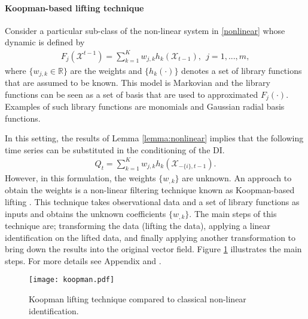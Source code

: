 \paragraph{Koopman-based lifting technique}
Consider a particular sub-class of the non-linear system in \eqref{nonlinear} whose dynamic is defined by
\begin{align}\label{nonlin}
F_{j}(\mathcal{X}^{t-1}) = \sum_{k=1}^K w_{j,k} h_k(\mathcal{X}_{t-1}), \ \ j=1,...,m,
\end{align}
where $\{w_{j,k}\in\mathbb{R}\}$ are the weights and $\{h_k(\cdot)\}$ denotes a set of library functions that are assumed to be known.
This model is Markovian and the library functions can be seen as a set of basis that are used to approximated $F_j(\cdot)$.
Examples of such library functions are monomials and Gaussian radial basis functions. 



In this setting, the results of Lemma \ref{lemma:nonlinear} implies that the following time series can be substituted in the conditioning of the DI. 
\begin{align}
    Q_t = \sum_{k=1}^K w_{j,k} h_k(\mathcal{X}_{-\{i\},t-1}).
\end{align}
However, in this formulation, the weights $\{w_{,k}\}$ are unknown. 
An approach to obtain the weights is a non-linear filtering technique known as Koopman-based lifting \citet{koopman1931hamiltonian}. 
This technique takes observational data and a set of library functions as inputs and obtains the unknown coefficients $\{w_{,k}\}$.
The main steps of this technique are; transforming the data (lifting the data),  applying a linear identification on the lifted data, and finally applying another transformation to bring down the results into the original vector field.  Figure \ref{fig:koopman} illustrates the main steps. For more details see Appendix and \citet{mauroy2019koopman}. 
\begin{figure}
\centering
\texttt{[image: koopman.pdf]}
\caption{Koopman lifting technique compared to classical non-linear identification.}\label{fig:koopman}
\end{figure}

